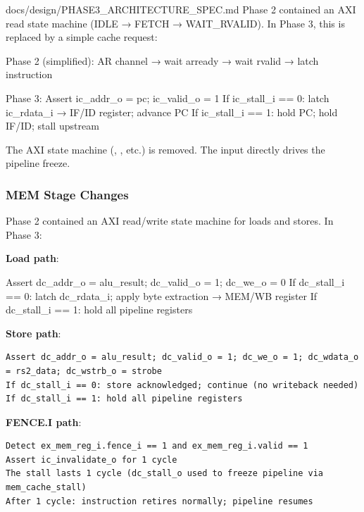 \begin{relocated}{docs/design/PHASE3_ARCHITECTURE_SPEC.md}
Phase 2  contained an AXI read state machine
(IDLE → FETCH → WAIT\_\allowbreak{}RVALID). In Phase 3, this is replaced
by a simple cache request:

\begin{textblock}
Phase 2 (simplified):
  AR channel → wait arready → wait rvalid → latch instruction

Phase 3:
  Assert ic_addr_o = pc; ic_valid_o = 1
  If ic_stall_i == 0: latch ic_rdata_i → IF/ID register; advance PC
  If ic_stall_i == 1: hold PC; hold IF/ID; stall upstream
\end{textblock}

The AXI state machine (, , etc.)
is removed. The  input directly drives the pipeline
freeze.

\subsubsection{MEM Stage Changes}\label{ds:ch:phase3-architecture:72-mem-stage-changes}

Phase 2  contained an AXI
read/\allowbreak{}write state machine for loads and stores. In Phase 3:

\textbf{Load path}:

\begin{textblock}
Assert dc_addr_o = alu_result; dc_valid_o = 1; dc_we_o = 0
If dc_stall_i == 0: latch dc_rdata_i; apply byte extraction → MEM/WB register
If dc_stall_i == 1: hold all pipeline registers
\end{textblock}

\textbf{Store path}:

\begin{lstlisting}[language={}]
Assert dc_addr_o = alu_result; dc_valid_o = 1; dc_we_o = 1; dc_wdata_o = rs2_data; dc_wstrb_o = strobe
If dc_stall_i == 0: store acknowledged; continue (no writeback needed)
If dc_stall_i == 1: hold all pipeline registers
\end{lstlisting}

\textbf{FENCE.I path}:

\begin{lstlisting}[language={}]
Detect ex_mem_reg_i.fence_i == 1 and ex_mem_reg_i.valid == 1
Assert ic_invalidate_o for 1 cycle
The stall lasts 1 cycle (dc_stall_o used to freeze pipeline via mem_cache_stall)
After 1 cycle: instruction retires normally; pipeline resumes
\end{lstlisting}


\end{relocated}
